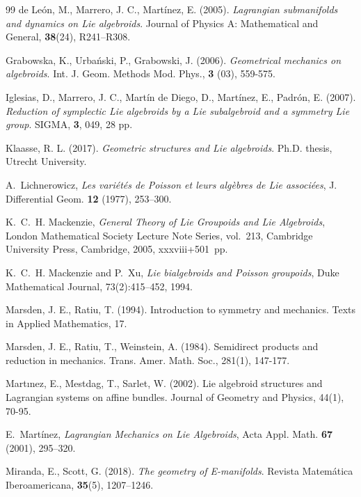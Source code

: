 \documentclass[12pt,letterpaper]{article}
\numberwithin{equation}{section}
\begin{document}
\begin{thebibliography}{99}
 de Le\'on, M., Marrero, J. C., Mart\'inez, E. (2005). \emph{ Lagrangian submanifolds and dynamics on Lie algebroids}. Journal of Physics A: Mathematical and General, \textbf{38}(24), R241--R308.

 Grabowska, K., Urba\'nski, P., Grabowski, J. (2006). \emph{Geometrical mechanics on algebroids}. Int. J. Geom. Methods Mod. Phys.,  \textbf{3} (03), 559-575.

 Iglesias, D., Marrero, J. C., Mart\'in de Diego, D., Mart\'inez, E., Padr\'on, E. (2007). \emph{Reduction of symplectic Lie algebroids by a Lie subalgebroid and a symmetry Lie group}. SIGMA, \textbf{3}, 049, 28 pp.

 Klaasse, R. L. (2017). \emph{Geometric structures and Lie algebroids}. Ph.D. thesis, Utrecht University. 

A.~Lichnerowicz,
\emph{Les vari\'{e}t\'{e}s de Poisson et leurs alg\`{e}bres de {L}ie associ\'{e}es},
J. Differential Geom. \textbf{12} (1977), 253--300.

K.~C.~H. Mackenzie,
\textit{General Theory of {Lie} Groupoids and {Lie} Algebroids},
London Mathematical Society Lecture Note Series, vol.~213,
Cambridge University Press, Cambridge, 2005, xxxviii+501~pp.

K.~C.~H. Mackenzie and P.~Xu,
\textit{Lie bialgebroids and {P}oisson groupoids},
Duke Mathematical Journal, 73(2):415--452, 1994.

 Marsden, J. E., Ratiu, T. (1994). Introduction to symmetry and mechanics. Texts in Applied Mathematics, 17.

 Marsden, J. E., Ratiu, T., Weinstein, A. (1984). Semidirect products and reduction in mechanics. Trans. Amer. Math. Soc., 281(1), 147-177.

 Martınez, E., Mestdag, T., Sarlet, W. (2002). Lie algebroid structures and Lagrangian systems on affine bundles. Journal of Geometry and Physics, 44(1), 70-95.

E.~Mart\'inez,
\textit{Lagrangian Mechanics on {Lie} Algebroids},
Acta Appl. Math. \textbf{67} (2001), 295--320.

 Miranda, E., Scott, G. (2018). \emph{The geometry of E-manifolds}. Revista Matem\'atica Iberoamericana, \textbf{35}(5), 1207--1246.


\end{thebibliography}
\end{document}

